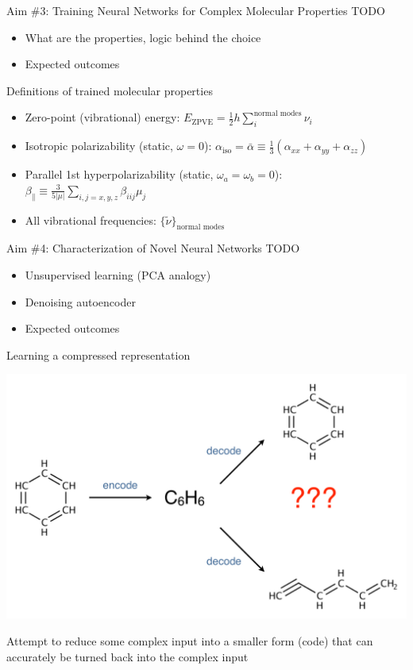 \documentclass[xetex,compress]{beamer}
\begin{document}

\begin{frame}{Aim \#3: Training Neural Networks for Complex Molecular Properties}
  TODO
  \begin{itemize}
  \item What are the properties, logic behind the choice
  \item Expected outcomes
  \end{itemize}
\end{frame}

\begin{frame}{Definitions of trained molecular properties}
  \begin{itemize}
  \item Zero-point (vibrational) energy: \(E_{\text{ZPVE}} = \frac{1}{2} h \sum_{i}^{\text{normal modes}} \nu_{i}\)
  \item Isotropic polarizability (static, \(\omega = 0\)): \(\alpha_{\text{iso}} = \bar{\alpha} \equiv \frac{1}{3} (\alpha_{xx} + \alpha_{yy} + \alpha_{zz})\)
  \item Parallel 1st hyperpolarizability (static, \(\omega_{a} = \omega_{b} = 0\)): \(\beta_{\parallel} \equiv \frac{3}{5|\mu|} \sum_{i,j=x,y,z} \beta_{iij} \mu_{j}\)
  \item All vibrational frequencies: \(\{\tilde{\nu}\}_{\text{normal modes}}\)
  \end{itemize}
\end{frame}

\begin{frame}{Aim \#4: Characterization of Novel Neural Networks}
  TODO
  \begin{itemize}
  \item Unsupervised learning (PCA analogy)
  \item Denoising autoencoder
  \item Expected outcomes
  \end{itemize}
\end{frame}

\begin{frame}{Learning a compressed representation}
  \begin{center}
    \includegraphics[width=1.00\textwidth]{./figures/autoencoder_example.pdf}
  \end{center}
  Attempt to reduce some complex input into a smaller form (code) that can accurately be turned back into the complex input
\end{frame}
\end{document}
